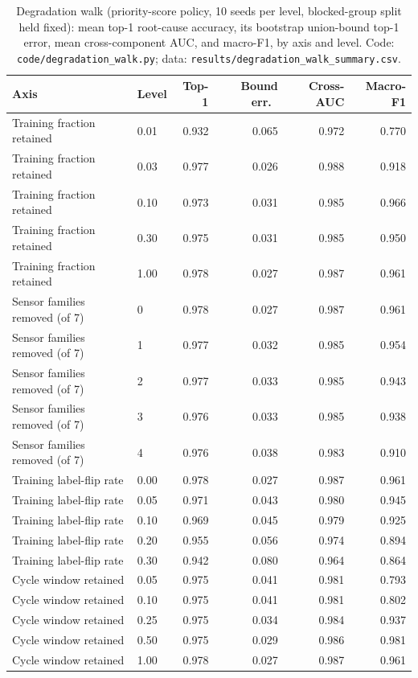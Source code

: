 \begin{table}[!t]
\centering
\caption{Degradation walk (priority-score policy, 10 seeds per level, blocked-group split held fixed): mean top-1 root-cause accuracy, its bootstrap union-bound top-1 error, mean cross-component AUC, and macro-F1, by axis and level. Code: \texttt{code/degradation\_walk.py}; data: \texttt{results/degradation\_walk\_summary.csv}.}
\label{tab:degradationwalk}
\footnotesize
\setlength{\tabcolsep}{3pt}
\begin{tabular}{llrrrr}
\hline
Axis & Level & Top-1 & Bound err.\ & Cross-AUC & Macro-F1 \\
\hline
Training fraction retained & 0.01 & 0.932 & 0.065 & 0.972 & 0.770 \\
Training fraction retained & 0.03 & 0.977 & 0.026 & 0.988 & 0.918 \\
Training fraction retained & 0.10 & 0.973 & 0.031 & 0.985 & 0.966 \\
Training fraction retained & 0.30 & 0.975 & 0.031 & 0.985 & 0.950 \\
Training fraction retained & 1.00 & 0.978 & 0.027 & 0.987 & 0.961 \\
\hline
Sensor families removed (of 7) & 0 & 0.978 & 0.027 & 0.987 & 0.961 \\
Sensor families removed (of 7) & 1 & 0.977 & 0.032 & 0.985 & 0.954 \\
Sensor families removed (of 7) & 2 & 0.977 & 0.033 & 0.985 & 0.943 \\
Sensor families removed (of 7) & 3 & 0.976 & 0.033 & 0.985 & 0.938 \\
Sensor families removed (of 7) & 4 & 0.976 & 0.038 & 0.983 & 0.910 \\
\hline
Training label-flip rate & 0.00 & 0.978 & 0.027 & 0.987 & 0.961 \\
Training label-flip rate & 0.05 & 0.971 & 0.043 & 0.980 & 0.945 \\
Training label-flip rate & 0.10 & 0.969 & 0.045 & 0.979 & 0.925 \\
Training label-flip rate & 0.20 & 0.955 & 0.056 & 0.974 & 0.894 \\
Training label-flip rate & 0.30 & 0.942 & 0.080 & 0.964 & 0.864 \\
\hline
Cycle window retained & 0.05 & 0.975 & 0.041 & 0.981 & 0.793 \\
Cycle window retained & 0.10 & 0.975 & 0.041 & 0.981 & 0.802 \\
Cycle window retained & 0.25 & 0.975 & 0.034 & 0.984 & 0.937 \\
Cycle window retained & 0.50 & 0.975 & 0.029 & 0.986 & 0.981 \\
Cycle window retained & 1.00 & 0.978 & 0.027 & 0.987 & 0.961 \\
\hline
\end{tabular}
\end{table}
